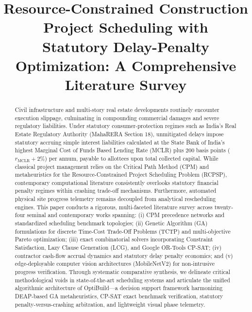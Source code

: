 \documentclass[conference]{IEEEtran}
\begin{document}
\title{Resource-Constrained Construction Project Scheduling with\\Statutory Delay-Penalty Optimization: A Comprehensive Literature Survey}

\author{
}

\maketitle

\begin{abstract}
Civil infrastructure and multi-story real estate developments routinely encounter execution slippage, culminating in compounding commercial damages and severe regulatory liabilities. Under statutory consumer-protection regimes such as India's Real Estate Regulatory Authority (MahaRERA Section 18), unmitigated delays impose statutory accruing simple interest liabilities calculated at the State Bank of India's highest Marginal Cost of Funds Based Lending Rate (MCLR) plus 200 basis points ($r_{\text{MCLR}} + 2\%$) per annum, payable to allottees upon total collected capital. While classical project management relies on the Critical Path Method (CPM) and metaheuristics for the Resource-Constrained Project Scheduling Problem (RCPSP), contemporary computational literature consistently overlooks statutory financial penalty regimes within crashing trade-off mechanisms. Furthermore, automated physical site progress telemetry remains decoupled from analytical rescheduling engines. This paper conducts a rigorous, multi-faceted literature survey across twenty-four seminal and contemporary works spanning: (i) CPM precedence networks and standardized scheduling benchmark topologies; (ii) Genetic Algorithm (GA) formulations for discrete Time-Cost Trade-Off Problems (TCTP) and multi-objective Pareto optimization; (iii) exact combinatorial solvers incorporating Constraint Satisfaction, Lazy Clause Generation (LCG), and Google OR-Tools CP-SAT; (iv) contractor cash-flow accrual dynamics and statutory delay penalty economics; and (v) edge-deployable computer vision architectures (MobileNetV2) for non-intrusive progress verification. Through systematic comparative synthesis, we delineate critical methodological voids in state-of-the-art scheduling systems and articulate the unified algorithmic architecture of OptiBuild---a decision support framework harmonizing DEAP-based GA metaheuristics, CP-SAT exact benchmark verification, statutory penalty-versus-crashing arbitration, and lightweight visual phase telemetry.
\end{abstract}
\end{document}
